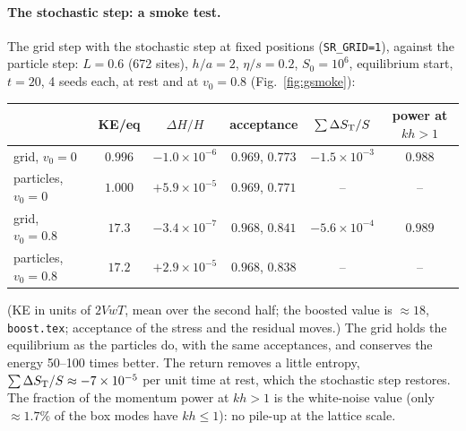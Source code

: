 \documentclass[11pt,aps,preprint,nofootinbib,superscriptaddress,tightenlines]{revtex4-2}
\def\Fig#1{Fig.~\ref{#1}}
\let\oldparagraph\paragraph
\renewcommand{\paragraph}{\par\bigskip\oldparagraph}
\begin{document}
\paragraph{The stochastic step: a smoke test.}  The grid step with the stochastic step at fixed
positions (\texttt{SR\_GRID=1}), against the particle step: $L=0.6$ (672 sites), $h/a=2$, $\eta/s=0.2$,
$S_0=10^6$, equilibrium start, $t=20$, 4 seeds each, at rest and at $v_0=0.8$ (\Fig{fig:gsmoke}):
\begin{center}
\begin{tabular}{lccccc}
\hline
 & KE/eq & $\Delta H/H$ & acceptance & $\sum\Delta S_{\rm T}/S$ & power at $kh>1$ \\ \hline
grid, $v_0=0$ & $0.996$ & $-1.0\times10^{-6}$ & $0.969$, $0.773$ & $-1.5\times10^{-3}$ & $0.988$ \\
particles, $v_0=0$ & $1.000$ & $+5.9\times10^{-5}$ & $0.969$, $0.771$ & -- & -- \\
grid, $v_0=0.8$ & $17.3$ & $-3.4\times10^{-7}$ & $0.968$, $0.841$ & $-5.6\times10^{-4}$ & $0.989$ \\
particles, $v_0=0.8$ & $17.2$ & $+2.9\times10^{-5}$ & $0.968$, $0.838$ & -- & -- \\
\hline
\end{tabular}
\end{center}
(KE in units of $2VwT$, mean over the second half; the boosted value is $\approx18$, \texttt{boost.tex};
acceptance of the stress and the residual moves.)  The grid holds the equilibrium as the particles
do, with the same acceptances, and conserves the energy 50--100 times better.  The return removes a
little entropy, $\sum\Delta S_{\rm T}/S\approx-7\times10^{-5}$ per unit time at rest, which the stochastic step
restores.  The fraction of the momentum power at $kh>1$ is the white-noise value (only $\approx1.7\%$
of the box modes have $kh\le1$): no pile-up at the lattice scale.
\end{document}
